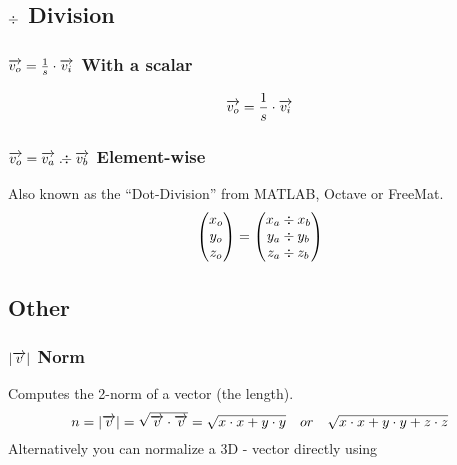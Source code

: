 \subsection{$\div$ Division}
\subsubsection*{$\overrightarrow{v_o} = \frac 1 s \cdot \overrightarrow{v_i}$ With a scalar}
\begin{equation}
	\overrightarrow{v_o} = \frac 1 s \cdot \overrightarrow{v_i}
\end{equation}

\subsubsection*{$\overrightarrow{v_o} = \overrightarrow{v_a} \;. \! \!\div \overrightarrow{v_b} $ Element-wise}
Also known as the ``Dot-Division'' from MATLAB, Octave or FreeMat.
\begin{equation}
	\begin{pmatrix}x_o\\y_o\\z_o\end{pmatrix} = 
	\begin{pmatrix}x_a \div x_b\\y_a \div y_b\\z_a \div z_b\end{pmatrix}
\end{equation}





\subsection{Other}
\subsubsection*{$|{\overrightarrow{v}}|$ Norm}
Computes the 2-norm of a vector (the length).
\begin{equation}
n = |{\overrightarrow{v}}| = \sqrt{\overrightarrow{v} \cdot \overrightarrow{v}} = \sqrt{x \cdot x + y \cdot y} \quad or \quad \sqrt{x \cdot x + y \cdot y + z \cdot z}
\end{equation}
Alternatively you can normalize a 3D - vector directly using

